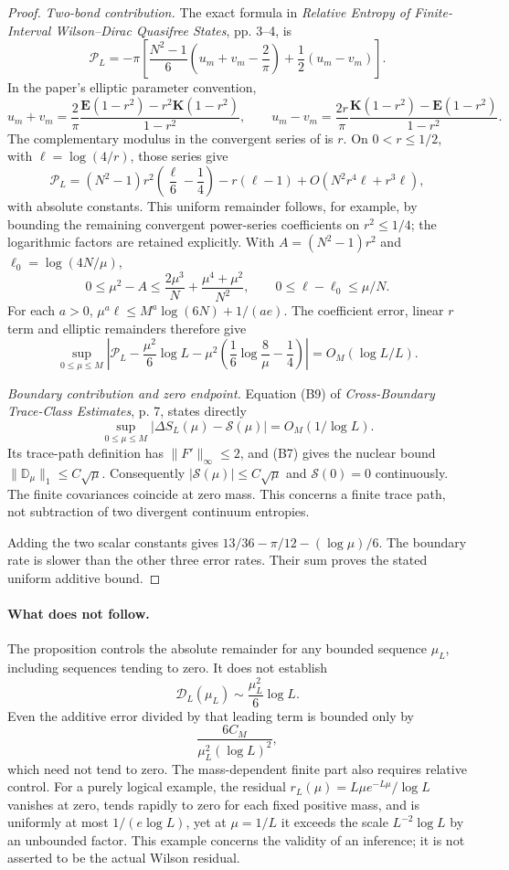 \documentclass[11pt,a4paper]{article}
\theoremstyle{definition}\newtheorem{definition}[theorem]{Definition}
\begin{document}
\begin{proof}
\emph{Two-bond contribution.} The exact formula in \emph{Relative Entropy of Finite-Interval Wilson–Dirac Quasifree States}, pp. 3–4, is
\[
\mathcal P_L=-\pi\left[\frac{N^2-1}{6}\left(u_m+v_m-\frac2\pi\right)
+\frac12(u_m-v_m)\right].
\]
In the paper's elliptic parameter convention,
\[
u_m+v_m=\frac2\pi\frac{\mathbf E(1-r^2)-r^2\mathbf K(1-r^2)}{1-r^2},\qquad
u_m-v_m=\frac{2r}\pi\frac{\mathbf K(1-r^2)-\mathbf E(1-r^2)}{1-r^2}.
\]
The complementary modulus in the convergent series of \cite{dlmf} is $r$. On $0<r\le1/2$, with $\ell=\log(4/r)$, those series give
\[
\mathcal P_L=(N^2-1)r^2\left(\frac\ell6-\frac14\right)-r(\ell-1)
+O(N^2r^4\ell+r^3\ell),
\]
with absolute constants. This uniform remainder follows, for example, by bounding the remaining convergent power-series coefficients on $r^2\le1/4$; the logarithmic factors are retained explicitly. With $A=(N^2-1)r^2$ and $\ell_0=\log(4N/\mu)$,
\[
0\le\mu^2-A\le\frac{2\mu^3}{N}+\frac{\mu^4+\mu^2}{N^2},\qquad
0\le\ell-\ell_0\le\mu/N.
\]
For each $a>0$, $\mu^a\ell\le M^a\log(6N)+1/(ae)$. The coefficient error, linear $r$ term and elliptic remainders therefore give
\[
\sup_{0\le\mu\le M}\left|\mathcal P_L-\frac{\mu^2}{6}\log L
-\mu^2\left(\frac16\log\frac8\mu-\frac14\right)\right|
=O_M(\log L/L).
\]

\emph{Boundary contribution and zero endpoint.} Equation (B9) of \emph{Cross-Boundary Trace-Class Estimates}, p. 7, states directly
\[
\sup_{0\le\mu\le M}|\Delta S_L(\mu)-\mathcal S(\mu)|=O_M(1/\log L).
\]
Its trace-path definition has $\|F'\|_\infty\le2$, and (B7) gives the nuclear bound $\|\mathbb D_\mu\|_1\le C\sqrt\mu$. Consequently $|\mathcal S(\mu)|\le C\sqrt\mu$ and $\mathcal S(0)=0$ continuously. The finite covariances coincide at zero mass. This concerns a finite trace path, not subtraction of two divergent continuum entropies.

Adding the two scalar constants gives $13/36-\pi/12-(\log\mu)/6$. The boundary rate is slower than the other three error rates. Their sum proves the stated uniform additive bound.
\end{proof}

\paragraph{What does not follow.}
The proposition controls the absolute remainder for any bounded sequence $\mu_L$, including sequences tending to zero. It does not establish
\[
\mathcal D_L(\mu_L)\sim \frac{\mu_L^2}{6}\log L.
\]
Even the additive error divided by that leading term is bounded only by
\[\frac{6C_M}{\mu_L^2(\log L)^2},\]
which need not tend to zero. The mass-dependent finite part also requires relative control. For a purely logical example, the residual $r_L(\mu)=L\mu e^{-L\mu}/\log L$ vanishes at zero, tends rapidly to zero for each fixed positive mass, and is uniformly at most $1/(e\log L)$, yet at $\mu=1/L$ it exceeds the scale $L^{-2}\log L$ by an unbounded factor. This example concerns the validity of an inference; it is not asserted to be the actual Wilson residual.
\end{document}
